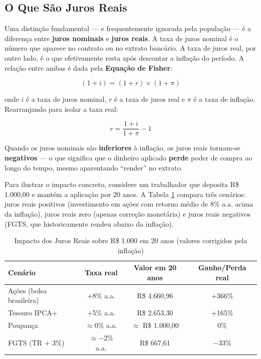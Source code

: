 \subsection{O Que São Juros Reais}

Uma distinção fundamental --- e frequentemente ignorada pela população --- é a diferença entre \textbf{juros nominais} e \textbf{juros reais}. A taxa de juros nominal é o número que aparece no contrato ou no extrato bancário. A taxa de juros real, por outro lado, é o que efetivamente resta após descontar a inflação do período. A relação entre ambas é dada pela \textbf{Equação de Fisher}:

\begin{equation}
\label{eq:fisher}
(1 + i) = (1 + r) \times (1 + \pi)
\end{equation}

\noindent onde $i$ é a taxa de juros nominal, $r$ é a taxa de juros real e $\pi$ é a taxa de inflação. Rearranjando para isolar a taxa real:

\begin{equation}
\label{eq:fisher-real}
r = \frac{1 + i}{1 + \pi} - 1
\end{equation}

Quando os juros nominais são \textbf{inferiores} à inflação, os juros reais tornam-se \textbf{negativos} --- o que significa que o dinheiro aplicado \textbf{perde} poder de compra ao longo do tempo, mesmo aparentando ``render'' no extrato.

Para ilustrar o impacto concreto, considere um trabalhador que deposita R\$ 1.000{,}00 e mantém a aplicação por 20 anos. A Tabela \ref{tab:juros-reais} compara três cenários: juros reais positivos (investimento em ações com retorno médio de 8\% a.a. acima da inflação), juros reais zero (apenas correção monetária) e juros reais negativos (FGTS, que historicamente rendeu abaixo da inflação).

\begin{table}[htb]
    \centering
    \caption{Impacto dos Juros Reais sobre R\$ 1.000 em 20 anos (valores corrigidos pela inflação)}
    \label{tab:juros-reais}
    \begin{tabular}{lccc}
        \toprule
        \textbf{Cenário} & \textbf{Taxa real} & \textbf{Valor em 20 anos} & \textbf{Ganho/Perda real} \\
        \midrule
        Ações (bolsa brasileira) & +8\% a.a. & R\$ 4.660{,}96 & +366\% \\
        Tesouro IPCA+ & +5\% a.a. & R\$ 2.653{,}30 & +165\% \\
        Poupança & $\approx$0\% a.a. & $\approx$ R\$ 1.000{,}00 & 0\% \\
        FGTS (TR + 3\%) & $\approx$$-$2\% a.a. & R\$ 667{,}61 & $-$33\% \\
        \bottomrule
    \end{tabular}
\end{table}

